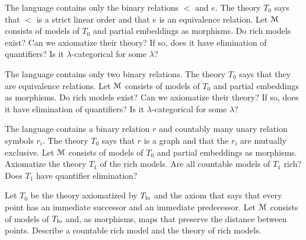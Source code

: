 
\begin{exercise}\label{ex_dlo+eqiovalenza}
  The language contains only the binary relations $<$ and $e$.
  The theory $T_0$ says that $<$ is a strict linear order and that $e$ is an equivalence relation.
  Let $\EuScript M$ consists of models of $T_0$ and partial embeddings as morphisms.
  Do rich models exist? Can we axiomatize their theory? If so, does it have elimination of quantifiers? Is it $\lambda$-categorical for some $\lambda$?
\end{exercise}

\begin{exercise}\label{ex_2bin_equivalenze}
  The language contains only two binary relations.
  The theory $T_0$ says that they are equivalence relations.
  Let $\EuScript M$ consists of models of $T_0$ and partial embeddings as morphisms.
  Do rich models exist? Can we axiomatize their theory? If so, does it have elimination of quantifiers? Is it $\lambda$-categorical for some $\lambda$?
\end{exercise}

\begin{exercise}
  The language contains a binary relation $r$ and countably many unary relation symbols $r_i$.
  The theory $T_0$ says that $r$ is a graph and that the $r_i$ are mutually exclusive.
  Let $\EuScript M$ consists of models of $T_0$ and partial embeddings as morphisms.
  Axiomatize the theory $T_1$ of the rich models.
  Are all countable models of $T_1$ rich?
  Does $T_1$ have quantifier elimination?
\end{exercise}

\begin{exercise}
  Let $T_0$ be the theory axiomatized by $T_{\rm lo}$ and the axiom that says that every point has an immediate successor and an immediate predecessor.
  Let $\EuScript M$ consists of models of $T_{\rm lo}$ and, as morphisms, maps that preserve the distance between points.
  Describe a countable rich model and the theory of rich models.
\end{exercise}

